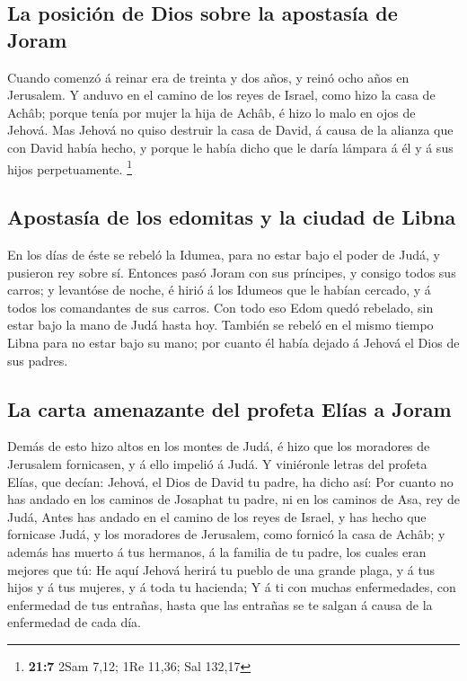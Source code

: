 \hypertarget{la-posiciuxf3n-de-dios-sobre-la-apostasuxeda-de-joram}{%
\subsection{La posición de Dios sobre la apostasía de
Joram}\label{la-posiciuxf3n-de-dios-sobre-la-apostasuxeda-de-joram}}

 Cuando comenzó á reinar era de treinta y dos años, y
reinó ocho años en Jerusalem.  Y anduvo en el camino de
los reyes de Israel, como hizo la casa de Achâb; porque tenía por mujer
la hija de Achâb, é hizo lo malo en ojos de Jehová.  Mas
Jehová no quiso destruir la casa de David, á causa de la alianza que con
David había hecho, y porque le había dicho que le daría lámpara á él y á
sus hijos perpetuamente. \footnote{\textbf{21:7} 2Sam 7,12; 1Re 11,36;
  Sal 132,17}

\hypertarget{apostasuxeda-de-los-edomitas-y-la-ciudad-de-libna}{%
\subsection{Apostasía de los edomitas y la ciudad de
Libna}\label{apostasuxeda-de-los-edomitas-y-la-ciudad-de-libna}}

 En los días de éste se rebeló la Idumea, para no estar
bajo el poder de Judá, y pusieron rey sobre sí.  Entonces
pasó Joram con sus príncipes, y consigo todos sus carros; y levantóse de
noche, é hirió á los Idumeos que le habían cercado, y á todos los
comandantes de sus carros.  Con todo eso Edom quedó
rebelado, sin estar bajo la mano de Judá hasta hoy. También se rebeló en
el mismo tiempo Libna para no estar bajo su mano; por cuanto él había
dejado á Jehová el Dios de sus padres.

\hypertarget{la-carta-amenazante-del-profeta-eluxedas-a-joram}{%
\subsection{La carta amenazante del profeta Elías a
Joram}\label{la-carta-amenazante-del-profeta-eluxedas-a-joram}}

 Demás de esto hizo altos en los montes de Judá, é hizo
que los moradores de Jerusalem fornicasen, y á ello impelió á Judá.
 Y viniéronle letras del profeta Elías, que decían:
Jehová, el Dios de David tu padre, ha dicho así: Por cuanto no has
andado en los caminos de Josaphat tu padre, ni en los caminos de Asa,
rey de Judá,  Antes has andado en el camino de los reyes
de Israel, y has hecho que fornicase Judá, y los moradores de Jerusalem,
como fornicó la casa de Achâb; y además has muerto á tus hermanos, á la
familia de tu padre, los cuales eran mejores que tú:  He
aquí Jehová herirá tu pueblo de una grande plaga, y á tus hijos y á tus
mujeres, y á toda tu hacienda;  Y á ti con muchas
enfermedades, con enfermedad de tus entrañas, hasta que las entrañas se
te salgan á causa de la enfermedad de cada día.

